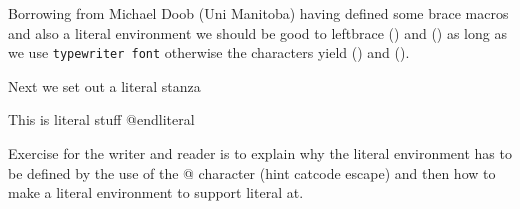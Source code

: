 Borrowing from Michael Doob (Uni Manitoba) having defined some brace macros
and also a literal environment we should be good to leftbrace ({\tt \lb}) and ({\tt \rb})
as long as we use {\tt typewriter font} otherwise the characters yield (\lb) and (\rb).

Next we set out a literal stanza

\beginliteral
This is literal stuff {}
@endliteral

Exercise for the writer and reader is to explain why the literal environment 
has to be defined by the use of the @ character (hint catcode escape)
and then how to make a literal environment to support literal at.


%
%
%
%

\bye

